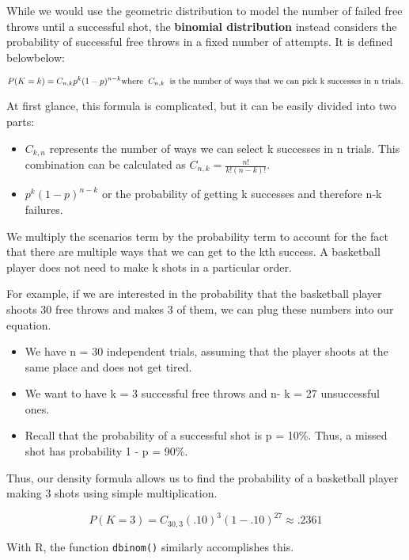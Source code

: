 \documentclass[
]{book}
\begin{document}
While we would use the geometric distribution to model the number of failed free throws until a successful shot, the \textbf{binomial distribution} instead considers the probability of successful free throws in a fixed number of attempts. It is defined belowbelow:

\[P(K = k) = C_{n,k}p^{k}(1-p)^{n-k}\\\textrm{where} \hspace{0.2cm}C_{n,k}\hspace{0.2cm}\textrm{is the number of ways that we can pick k successes in n trials.}\]

At first glance, this formula is complicated, but it can be easily divided into two parts:

\begin{itemize}
\item
  \(C_{k,n}\) represents the number of ways we can select k successes in n trials. This combination can be calculated as \(C_{n,k}=\frac{n!}{k!(n-k)!}\).
\item
  \(p^{k}(1-p)^{n-k}\) or the probability of getting k successes and therefore n-k failures.
\end{itemize}

We multiply the scenarios term by the probability term to account for the fact that there are multiple ways that we can get to the kth success. A basketball player does not need to make k shots in a particular order.

For example, if we are interested in the probability that the basketball player shoots 30 free throws and makes 3 of them, we can plug these numbers into our equation.

\begin{itemize}
\item
  We have n = 30 independent trials, assuming that the player shoots at the same place and does not get tired.
\item
  We want to have k = 3 successful free throws and n- k = 27 unsuccessful ones.
\item
  Recall that the probability of a successful shot is p = 10\%. Thus, a missed shot has probability 1 - p = 90\%.
\end{itemize}

Thus, our density formula allows us to find the probability of a basketball player making 3 shots using simple multiplication.

\[P(K = 3) = C_{30,3}(.10)^{3}(1-.10)^{27}\approx.2361\]

With R, the function \texttt{dbinom()} similarly accomplishes this.
\end{document}
